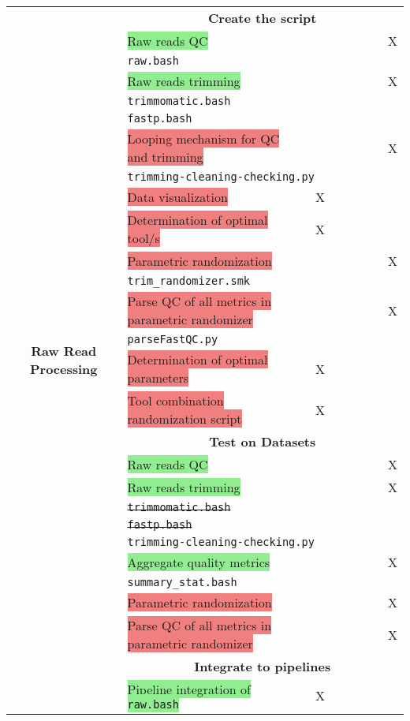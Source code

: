 \documentclass[11pt]{report}
\newcommand{\highlightessential}[1]{\colorbox{lightgreen}{#1}}
\newcommand{\highlightrobust}[1]{\colorbox{lightcoral}{#1}}
\newcommand{\deprecated}[1]{\sout{#1}}
\begin{document}
\begin{longtable}{|c|p{8cm}|c|c|c|c|c|c|}
	\multirow{29}{*}{\textbf{Raw Read Processing}}
	& \multicolumn{7}{c|}{\textbf{Create the script}} \\
	& \highlightessential{Raw reads QC} & & & & & & X \\ 
	& \multicolumn{7}{l}{\texttt{raw.bash}} \\ 
	& \highlightessential{Raw reads trimming} & & & & & & X \\ 
	& \multicolumn{7}{l}{\texttt{trimmomatic.bash}} \\ 
	& \multicolumn{7}{l}{\texttt{fastp.bash}} \\
	& \highlightrobust{Looping mechanism for QC and trimming} & & & & & & X \\
	& \multicolumn{7}{l}{\texttt{trimming-cleaning-checking.py}} \\ 
	& \highlightrobust{Data visualization} & X & & & & & \\
	& \highlightrobust{Determination of optimal tool/s} & X & & & & & \\
	& \highlightrobust{Parametric randomization} & & & & & & X \\
	& \multicolumn{7}{l}{\texttt{trim\_randomizer.smk}} \\
	& \highlightrobust{Parse QC of all metrics in parametric randomizer} & & & & & & X \\
	& \multicolumn{7}{l}{\texttt{parseFastQC.py}} \\
	& \highlightrobust{Determination of optimal parameters} & X & & & & & \\
	& \highlightrobust{Tool combination randomization script} & X & & & & & \\
	& \multicolumn{7}{c|}{\textbf{Test on Datasets}} \\
	& \highlightessential{Raw reads QC} & & & & & & X \\ 
	& \highlightessential{Raw reads trimming} & & & & & & X \\ 
	& \multicolumn{7}{l}{\texttt{\deprecated{trimmomatic.bash}}} \\ 
	& \multicolumn{7}{l}{\texttt{\deprecated{fastp.bash}}} \\
	& \multicolumn{7}{l}{\texttt{trimming-cleaning-checking.py}} \\ 
	& \highlightessential{Aggregate quality metrics} & & & & & & X \\
	& \multicolumn{7}{l}{\texttt{summary\_stat.bash}} \\ 
	& \highlightrobust{Parametric randomization} & & & & & & X \\
	& \highlightrobust{Parse QC of all metrics in parametric randomizer} & & & & & & X \\
	& \multicolumn{7}{c|}{\textbf{Integrate to pipelines}} \\
	& \highlightessential{Pipeline integration of \texttt{raw.bash}} & X & & & & & \\
	

\end{longtable}
\end{document}
